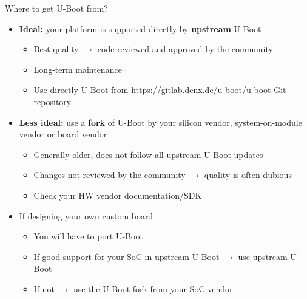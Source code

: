 \begin{frame}{Where to get U-Boot from?}
  \begin{itemize}
  \item {\bf Ideal:} your platform is supported directly by {\bf
      upstream} U-Boot
    \begin{itemize}
    \item Best quality $\rightarrow$ code reviewed and approved by the community
    \item Long-term maintenance
    \item Use directly U-Boot from
      \url{https://gitlab.denx.de/u-boot/u-boot} Git repository
    \end{itemize}
  \item {\bf Less ideal:} use a {\bf fork} of U-Boot by your silicon
    vendor, system-on-module vendor or board vendor
    \begin{itemize}
    \item Generally older, does not follow all upstream U-Boot updates
    \item Changes not reviewed by the community $\rightarrow$ quality
      is often dubious
    \item Check your HW vendor documentation/SDK
    \end{itemize}
  \item If designing your own custom board
    \begin{itemize}
    \item You will have to port U-Boot
    \item If good support for your SoC in upstream U-Boot
      $\rightarrow$ use upstream U-Boot
    \item If not $\rightarrow$ use the U-Boot fork from your SoC
      vendor
    \end{itemize}
  \end{itemize}
\end{frame}

